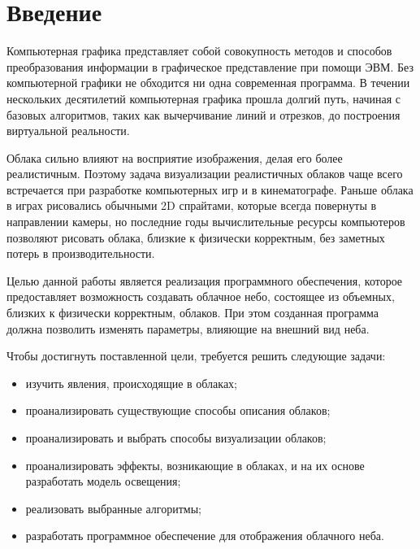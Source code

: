 \section*{Введение}

Компьютерная графика представляет собой совокупность методов
и способов преобразования информации в графическое представление при
помощи ЭВМ. Без компьютерной графики не обходится ни одна современная
программа. В течении нескольких десятилетий компьютерная графика прошла
долгий путь, начиная с базовых алгоритмов, таких как вычерчивание линий
и отрезков, до построения виртуальной реальности.

Облака сильно влияют на восприятие изображения, делая его более реалистичным. Поэтому задача визуализации реалистичных облаков чаще всего встречается при разработке компьютерных игр и в кинематографе. Раньше облака в играх рисовались обычными 2D спрайтами, которые всегда повернуты в направлении камеры, но последние годы вычислительные ресурсы компьютеров позволяют рисовать облака, близкие к физически корректным, без заметных потерь в производительности.

Целью данной работы является реализация программного обеспечения, которое предоставляет возможность создавать облачное небо, состоящее из объемных, близких к физически корректным, облаков. При этом созданная программа должна позволить изменять параметры, влияющие на внешний вид неба.

Чтобы достигнуть поставленной цели, требуется решить следующие задачи:

\begin{itemize}
	\item изучить явления, происходящие в облаках;
	\item проанализировать существующие способы описания облаков;
	\item проанализировать и выбрать способы визуализации облаков;
	\item проанализировать эффекты, возникающие в облаках, и на их основе разработать модель освещения;
	\item реализовать выбранные алгоритмы;
	\item разработать программное обеспечение для отображения облачного неба.
\end{itemize}
